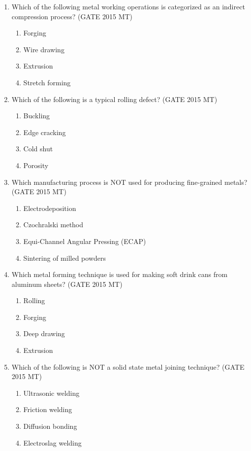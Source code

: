 \documentclass[12pt]{article}
\begin{document}
\begin{enumerate}
\item  Which of the following metal working operations is categorized as an indirect compression process? (GATE 2015 MT)
\begin{enumerate}[label=(\alph*)]
  \item Forging
  \item Wire drawing
  \item Extrusion
  \item Stretch forming
\end{enumerate}

\item  Which of the following is a typical rolling defect? (GATE 2015 MT)
\begin{enumerate}[label=(\alph*)]
  \item Buckling
  \item Edge cracking
  \item Cold shut
  \item Porosity
\end{enumerate}

\item Which manufacturing process is NOT used for producing fine-grained metals? (GATE 2015 MT)
\begin{enumerate}[label=(\alph*)]
  \item Electrodeposition
  \item Czochralski method
  \item Equi-Channel Angular Pressing (ECAP)
  \item Sintering of milled powders
\end{enumerate}

\item  Which metal forming technique is used for making soft drink cans from aluminum sheets? (GATE 2015 MT)
\begin{enumerate}[label=(\alph*)]
  \item Rolling
  \item Forging
  \item Deep drawing
  \item Extrusion
\end{enumerate}

\item  Which of the following is NOT a solid state metal joining technique? (GATE 2015 MT)
\begin{enumerate}[label=(\alph*)]
  \item Ultrasonic welding
  \item Friction welding
  \item Diffusion bonding
  \item Electroslag welding
\end{enumerate}


\end{enumerate}
\end{document}
